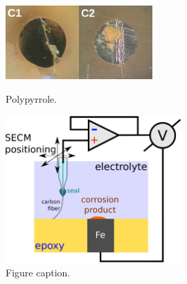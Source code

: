 \documentclass[3p]{elsarticle}
\begin{document}
\begin{figure}[H]
\includegraphics[width=0.25\textwidth]{ppyrrole_cut.jpg}\hspace{2cm}\includegraphics[width=0.25\textwidth]{pphenol_cut.jpg}
\caption{Polypyrrole.}
\label{fig:deconvolution}
\end{figure}

\begin{figure}[H]
\centering
\includegraphics[width=0.6\textwidth]{whisker.eps}
\caption{Figure caption.}
\label{fig:deconvolution}
\end{figure}
\end{document}
